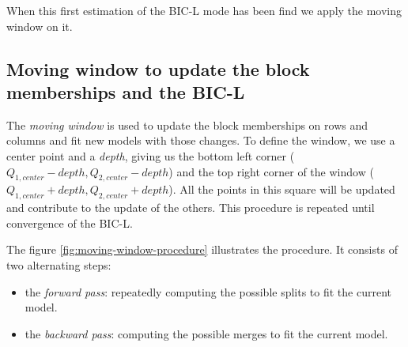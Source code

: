 \documentclass[12pt,a4paper]{report}
\begin{document}
When this first estimation of the BIC-L mode has been find we apply the moving
window on it.
\subsection{Moving window to update the block memberships and the BIC-L}
\label{ssec:moving-window-to-update-the-block-memberships-and-the-bic-l}
The \emph{moving window} is used to update the block memberships on rows and
columns and fit new models with those changes.
To define the window, we use a center point and a \emph{depth}, giving us the
bottom left corner ($Q_{1,center} - depth, Q_{2,center} - depth$) and the top right corner of the
window ($Q_{1,center} + depth, Q_{2,center} + depth$). All the points in this square will be
updated and contribute to the update of the others.
This procedure is repeated until convergence of the BIC-L.

The figure \ref{fig:moving-window-procedure} illustrates the procedure. It consists of two alternating steps:
\begin{itemize}
    \item the \emph{forward pass}: repeatedly computing the possible splits to
          fit the current model.
    \item the \emph{backward pass}: computing the possible merges to fit the current model.
\end{itemize}
\end{document}
